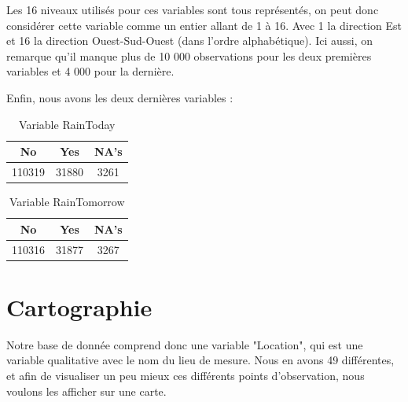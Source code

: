 \documentclass{article}
\begin{document}
\begin{table}[H]
    \centering
    \caption{Variable WindDir3pm}
\end{table}

Les 16 niveaux utilisés pour ces variables sont tous représentés, on peut donc considérer cette variable comme un entier allant de 1 à 16. Avec 1 la direction Est et 16 la direction Ouest-Sud-Ouest (dans l'ordre alphabétique). Ici aussi, on remarque qu'il manque plus de  10 000 observations pour les deux premières variables et 4 000 pour la dernière. 

Enfin, nous avons les deux dernières variables : 

\begin{table}[H]
    \centering
    \begin{tabular}{|c|c|c|}
        \hline
            No &    Yes &   NA's \\
        \hline
        110319 &  31880 &   3261 \\
        \hline
    \end{tabular}
    \caption{Variable RainToday}
\end{table}

\begin{table}[H]
    \centering
    \begin{tabular}{|c|c|c|}
        \hline
            No &    Yes &   NA's \\
        \hline
        110316 &  31877 &   3267 \\
        \hline
    \end{tabular}
    \caption{Variable RainTomorrow}
\end{table}
      
\section{Cartographie}

Notre base de donnée comprend donc une variable "Location", qui est une variable qualitative avec le nom du lieu de mesure. Nous en avons 49 différentes, et afin de visualiser un peu mieux ces différents points d'observation, nous voulons les afficher sur une carte.
\end{document}
